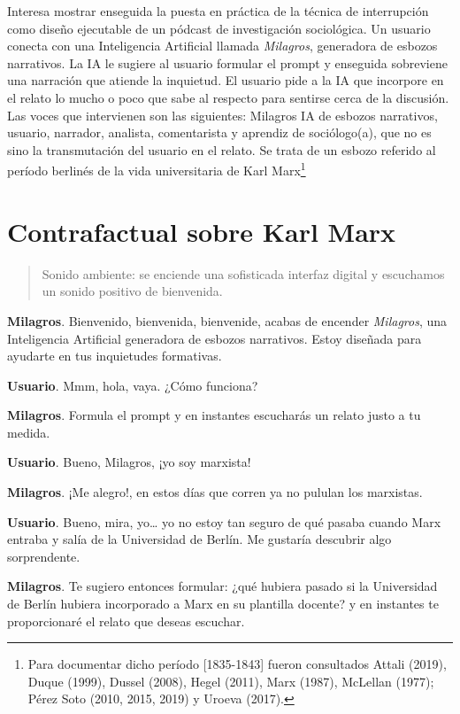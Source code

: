\documentclass[
]{interact}
\begin{document}
Interesa mostrar enseguida la puesta en práctica de la técnica de
interrupción como diseño ejecutable de un pódcast de investigación
sociológica. Un usuario conecta con una Inteligencia Artificial llamada
\emph{Milagros}, generadora de esbozos narrativos. La IA le sugiere al
usuario formular el prompt y enseguida sobreviene una narración que
atiende la inquietud. El usuario pide a la IA que incorpore en el relato
lo mucho o poco que sabe al respecto para sentirse cerca de la
discusión. Las voces que intervienen son las siguientes: Milagros IA de
esbozos narrativos, usuario, narrador, analista, comentarista y aprendiz
de sociólogo(a), que no es sino la transmutación del usuario en el
relato. Se trata de un esbozo referido al período berlinés de la vida
universitaria de Karl Marx\footnote{Para documentar dicho período
  {[}1835-1843{]} fueron consultados Attali (2019), Duque (1999), Dussel
  (2008), Hegel (2011), Marx (1987), McLellan (1977); Pérez Soto (2010,
  2015, 2019) y Uroeva (2017).}

\section{Contrafactual sobre Karl
Marx}\label{contrafactual-sobre-karl-marx}

\begin{quote}
Sonido ambiente: se enciende una sofisticada interfaz digital y
escuchamos un sonido positivo de bienvenida.
\end{quote}

\textbf{Milagros}. Bienvenido, bienvenida, bienvenide, acabas de
encender \emph{Milagros}, una Inteligencia Artificial generadora de
esbozos narrativos. Estoy diseñada para ayudarte en tus inquietudes
formativas.

\textbf{Usuario}. Mmm, hola, vaya. ¿Cómo funciona?

\textbf{Milagros}. Formula el prompt y en instantes escucharás un relato
justo a tu medida.

\textbf{Usuario}. Bueno, Milagros, ¡yo soy marxista!

\textbf{Milagros}. ¡Me alegro!, en estos días que corren ya no pululan
los marxistas.

\textbf{Usuario}. Bueno, mira, yo\ldots{} yo no estoy tan seguro de qué
pasaba cuando Marx entraba y salía de la Universidad de Berlín. Me
gustaría descubrir algo sorprendente.

\textbf{Milagros}. Te sugiero entonces formular: ¿qué hubiera pasado si
la Universidad de Berlín hubiera incorporado a Marx en su plantilla
docente? y en instantes te proporcionaré el relato que deseas escuchar.
\end{document}

